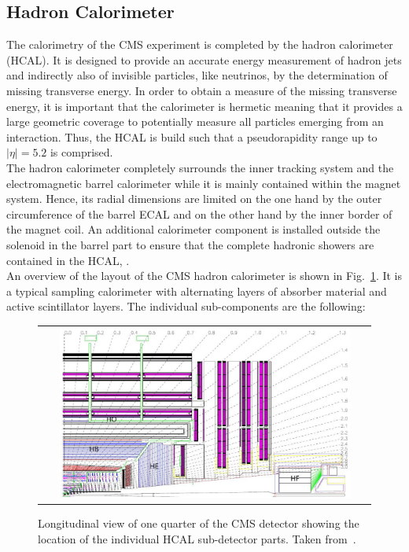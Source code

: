 \subsection{Hadron Calorimeter}
\label{subsec:cms_hcal}
The calorimetry of the CMS experiment is completed by the hadron calorimeter (HCAL). It is designed to provide an accurate energy measurement of hadron jets and indirectly also of invisible particles, like \eg neutrinos, by the determination of missing transverse energy. In order to obtain a measure of the missing transverse energy, it is important that the calorimeter is hermetic meaning that it provides a large geometric coverage to potentially measure all particles emerging from an interaction. Thus, the HCAL is build such that a pseudorapidity range up to $|\eta| = 5.2$ is comprised. \\ 
The hadron calorimeter completely surrounds the inner tracking system and the electromagnetic barrel calorimeter while it is mainly contained within the magnet system. Hence, its radial dimensions are limited on the one hand by the outer circumference of the barrel ECAL and on the other hand by the inner border of the magnet coil. An additional calorimeter component is installed outside the solenoid in the barrel part to ensure that the complete hadronic showers are contained in the HCAL, . \\
An overview of the layout of the CMS hadron calorimeter is shown in Fig.~\ref{fig:CMS_hcal}. It is a typical sampling calorimeter with alternating layers of absorber material and active scintillator layers. The individual sub-components are the following:
\begin{figure}[!tp]
  \centering
  \begin{tabular}{c}
    \includegraphics[width=0.9\textwidth]{figures/Figures_Experimental_Apparatus_HCAL.png}
  \end{tabular}
  \caption{Longitudinal view of one quarter of the CMS detector showing the location of the individual HCAL sub-detector parts. Taken from~\cite{Chatrchyan:2008zzk}.}
  \label{fig:CMS_hcal}
\end{figure}
